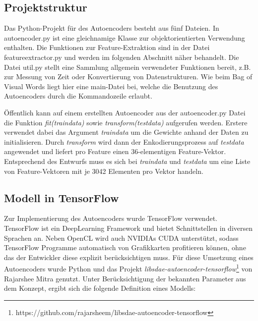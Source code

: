 \subsection{Projektstruktur} Das Python-Projekt für des Autoencoders besteht aus fünf Dateien. In autoencoder.py ist eine gleichnamige Klasse zur objektorientierten Verwendung enthalten. Die Funktionen zur Feature-Extraktion sind in der Datei feature\textunderscore extractor.py und werden im folgenden Abschnitt näher behandelt. Die Datei util.py stellt eine Sammlung allgemein verwendeter Funktionen bereit, z.B. zur Messung von Zeit oder Konvertierung von Datenstrukturen. Wie beim Bag of Visual Words liegt hier eine main-Datei bei, welche die Benutzung des Autoencoders durch die Kommandozeile erlaubt.


Öffentlich kann auf einem erstellten Autoencoder aus der autoencoder.py Datei die Funktion \textit{fit(train\textunderscore data)} sowie \textit{transform(test\textunderscore data)} aufgerufen werden. Erstere verwendet dabei das Argument \textit{train\textunderscore data} um die Gewichte anhand der Daten zu initialisieren.  Durch \textit{transform} wird dann der Enkodierungsprozess auf \textit{test\textunderscore data} angewendet und liefert pro Feature einen 36-elementigen Feature-Vektor. Entsprechend des Entwurfs muss es sich bei \textit{train\textunderscore data} und \textit{test\textunderscore data} um eine Liste von Feature-Vektoren mit je 3042 Elementen pro Vektor handeln.

\subsection{Modell in TensorFlow}

Zur Implementierung des Autoencoders wurde TensorFlow verwendet. TensorFlow ist ein DeepLearning Framework und bietet Schnittstellen in diversen Sprachen an. Neben OpenCL wird auch NVIDIAs CUDA unterstützt, sodass TensorFlow Programme automatisch von Grafikkarten profitieren können, ohne das der Entwickler diese explizit berücksichtigen muss. Für diese Umsetzung eines Autoencoders wurde Python und das Projekt \textit{libsdae-autoencoder-tensorflow}\footnote{https://github.com/rajarsheem/libsdae-autoencoder-tensorflow} von Rajarshee Mitra genutzt. Unter Berücksichtigung der bekannten Parameter aus dem Konzept, ergibt sich die folgende Definition eines Modells:

